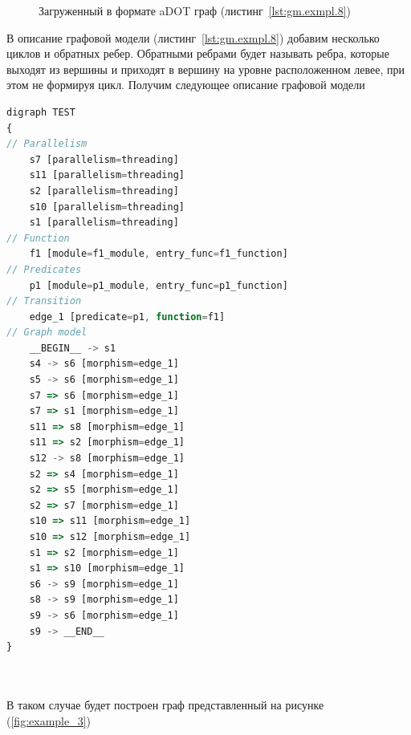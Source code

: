 \begin{figure}[ht!]
\caption{Загруженный в формате aDOT граф (листинг~\ref{lst:gm.exmpl.8})}
\label{fig:example_2}
\end{figure}

В описание графовой модели (листинг~\ref{lst:gm.exmpl.8}) добавим несколько циклов и обратных ребер. Обратными ребрами будет называть ребра, которые выходят из вершины и приходят в вершину на уровне расположенном левее, при этом не формируя цикл. Получим следующее описание графовой модели 

\begin{lstlisting}[label={lst:gm.exmpl.9}, caption={Пример описание графовой модели в формате aDOT включающей циклы}, language=JavaScript]
digraph TEST
{
// Parallelism
	s7 [parallelism=threading]
	s11 [parallelism=threading]
	s2 [parallelism=threading]
	s10 [parallelism=threading]
	s1 [parallelism=threading]
// Function
	f1 [module=f1_module, entry_func=f1_function]
// Predicates
	p1 [module=p1_module, entry_func=p1_function]
// Transition
	edge_1 [predicate=p1, function=f1]
// Graph model
	__BEGIN__ -> s1
	s4 -> s6 [morphism=edge_1]
	s5 -> s6 [morphism=edge_1]
	s7 => s6 [morphism=edge_1]
	s7 => s1 [morphism=edge_1]
	s11 => s8 [morphism=edge_1]
	s11 => s2 [morphism=edge_1]
	s12 -> s8 [morphism=edge_1]
	s2 => s4 [morphism=edge_1]
	s2 => s5 [morphism=edge_1]
	s2 => s7 [morphism=edge_1]
	s10 => s11 [morphism=edge_1]
	s10 => s12 [morphism=edge_1]
	s1 => s2 [morphism=edge_1]
	s1 => s10 [morphism=edge_1]
	s6 -> s9 [morphism=edge_1]
	s8 -> s9 [morphism=edge_1]
	s9 -> s6 [morphism=edge_1]
	s9 -> __END__ 
}
\end{lstlisting}

~\\~\\


В таком случае будет построен граф представленный на рисунке (\ref{fig:example_3})

